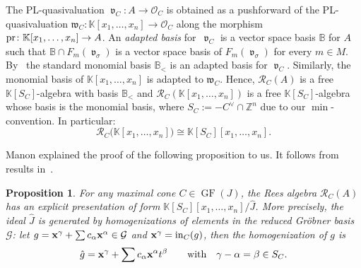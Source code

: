 \documentclass[pdftex]{sigma}%
\newtheorem{Proposition}[Theorem]{Proposition}
\numberwithin{equation}{section}
\DeclareMathOperator{\init}{in}
\DeclareMathOperator{\GF}{GF}
\DeclareMathOperator{\val}{\mathfrak v}
\begin{document}
The PL-quasivaluation $\val_C\colon A\to \mathcal O_C$ is obtained as a pushforward of the PL-quasivaluation $\mathfrak{w}_C\colon \mathbb K[x_1,\dots,x_n]\to \mathcal O_C$ along the morphism ${\rm pr}\colon \mathbb K[x_1,\dots,x_n]\to A$.
An {\it adapted basis} for~$\val_C$ is a vector space basis $\mathbb B$ for $A$ such that $\mathbb B\cap F_m(\val_\sigma)$ is a vector space basis of $F_m(\val_\sigma)$ for every $m\in M$.
By~\cite{KM-toricbundles} the standard monomial basis $\mathbb B_<$ is an adapted basis for $\val_C$.
Similarly, the monomial basis of $\mathbb K[x_1,\dots,x_n]$ is adapted to $\mathfrak{w}_C$.
Hence, $\mathcal R_C(A)$ is a free $\mathbb K[S_C]$-algebra with basis $\mathbb B_<$ and $\mathcal R_C(\mathbb K[x_1,\dots,x_n])$ is a free $\mathbb K[S_C]$-algebra whose basis is the monomial basis, where $S_C:=-C^\vee \cap \mathbb Z^n$ due to our $\min$-convention.
In particular: %
\begin{equation}\label{eq:Rees poly}
\mathcal R_C\big(\mathbb K[x_1,\dots,x_n]\big)\cong \mathbb K[S_C][x_1,\dots,x_n].
\end{equation}

Manon explained the proof of the following proposition to us. It follows from results in~\cite{KM-toricbundles}.

\begin{Proposition}
For any maximal cone $C\in\GF(J)$, the Rees algebra $\mathcal R_C(A)$ has an explicit presentation of form $\mathbb K[S_C][x_1,\dots,x_n]/\hat J$.
More precisely, the ideal $\hat J$ is generated by homogenizations of elements in the reduced Gr\"obner basis $\mathcal G$:
let $g={\bf x}^\gamma+\sum c_\alpha{\bf x}^\alpha\in \mathcal G$ and ${\bf x}^\gamma=\init_C(g)$, then the {\it homogenization} of $g$ is
\begin{equation}\label{eq:homog}
\hat g= {\bf x}^\gamma+\sum c_\alpha {\bf x}^\alpha t^\beta\qquad \text{with}\quad \gamma-\alpha=\beta\in S_C.
\end{equation}
\end{Proposition}
\end{document}
